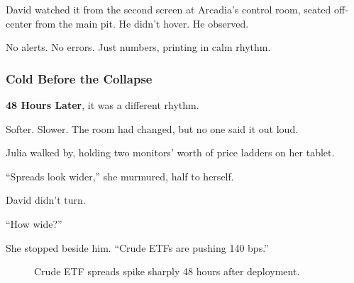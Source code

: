 David watched it from the second screen at Arcadia’s control room, seated off-center from the main pit.
He didn’t hover.
He observed.

No alerts. No errors.
Just numbers, printing in calm rhythm.



\subsubsection{Cold Before the Collapse}

\textbf{48 Hours Later}, it was a different rhythm.

Softer. Slower.
The room had changed, but no one said it out loud.

Julia walked by, holding two monitors’ worth of price ladders on her tablet.

“Spreads look wider,” she murmured, half to herself.

David didn’t turn.

“How wide?”

She stopped beside him. “Crude ETFs are pushing 140 bps.”

\medskip

\begin{figure}[H]
  \centering
  \caption{Crude ETF spreads spike sharply 48 hours after deployment.}
\end{figure}

\medskip

